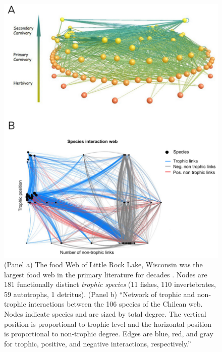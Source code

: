 \begin{figure}
    \centering
    \includegraphics[width=0.8\columnwidth]{figures/methods/fig_history.pdf}
    \caption[Historical ecological networks]{(Panel a) The food Web of Little Rock Lake, Wisconsin \cite{martinez1991artifacts} was the largest food web in the primary literature for decades \cite{strogatz2001exploring}. Nodes are 181 functionally distinct \textit{trophic species} (11 fishes, 110 invertebrates, 59 autotrophs, 1 detritus). (Panel b) ``Network of trophic and non-trophic interactions between the 106 species of the Chilean web. Nodes indicate species and are sized by total degree. The vertical position is proportional to trophic level and the horizontal position is proportional to non-trophic degree. Edges are blue, red, and gray for trophic, positive, and negative interactions, respectively.'' \cite{kefi2016structured}}
    \label{chp:methods:fig:history}
\end{figure}

